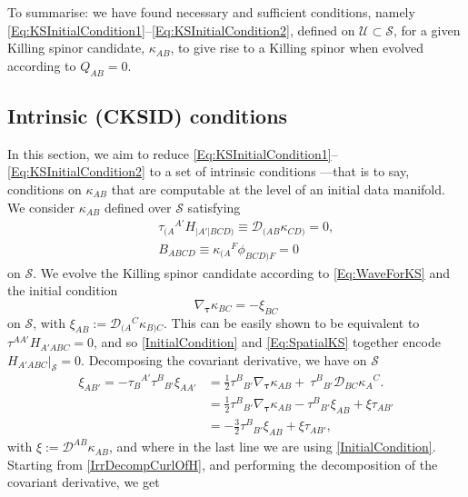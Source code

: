 \documentclass[10pt,a4paper]{article}
\theoremstyle{plain}
\begin{document}
To summarise: we have found necessary and sufficient conditions, namely \eqref{Eq:KSInitialCondition1}--\eqref{Eq:KSInitialCondition2}, defined on $\mathcal{U}\subset \mathcal{S}$, for a given Killing spinor candidate, $\kappa_{AB}$, to give rise to a Killing spinor when evolved according to $Q_{AB}=0$. 

\subsection{Intrinsic (CKSID) conditions}

In this section, we aim to reduce \eqref{Eq:KSInitialCondition1}--\eqref{Eq:KSInitialCondition2} to a set of intrinsic conditions ---that is to say, conditions on $\kappa_{AB}$ that are computable at the level of an initial data manifold. We consider $\kappa_{AB}$ defined over $\mathcal{S}$ satisfying
\begin{subequations}
\begin{eqnarray}
      && \tau_{(A}{}^{A'}H_{\vert A'\vert BCD)} \equiv  \mathcal{D}_{(AB}\kappa_{CD)}=0, \label{Eq:SpatialKS}\\
      && B_{ABCD}\equiv \kappa_{(A}{}^F\phi_{BCD)F} = 0 \label{Eq:VanishingBuchdahl}
\end{eqnarray}
\end{subequations}
on $\mathcal{S}$. We evolve the Killing spinor candidate according to \eqref{Eq:WaveForKS} and the initial condition
\begin{equation}
     \nabla_{\bm\tau} \kappa_{BC} = - \xi_{BC}\label{InitialCondition}
\end{equation}
on $\mathcal{S}$, with $\xi_{AB}:=\mathcal{D}_{(A}{}^C\kappa_{B)C}$. This can be easily shown to be equivalent to $\tau^{AA'}H_{A'ABC}=0$, and so \eqref{InitialCondition} and \eqref{Eq:SpatialKS} together encode $H_{A'ABC}\big\vert_{\mathcal{S}}=0$. Decomposing the covariant derivative, we have on $\mathcal{S}$
\begin{align}
\xi_{AB'} =  - \tau_{B}{}^{A'} \tau^{B}{}_{B'}\xi_{AA'} &=\tfrac{1}{2}\tau^{B}{}_{B'}\nabla_{\bm\tau}\kappa_{AB} + \
\tau^{B}{}_{B'} \mathcal{D}_{BC}\kappa_{A}{}^{C}. \nonumber\\
&=\tfrac{1}{2}\tau^{B}{}_{B'}\nabla_{\bm\tau}\kappa_{AB} - \tau^B{}_{B'}\xi_{AB} + \xi\tau_{AB'} \nonumber\\
&= -\tfrac{3}{2} \tau^B{}_{B'}\xi_{AB} + \xi\tau_{AB'} \label{DecompXiOnSUsingInitialCondition},
\end{align}
with $\xi:=\mathcal{D}^{AB}\kappa_{AB}$, and where in the last line we are using \eqref{InitialCondition}. Starting from \eqref{IrrDecompCurlOfH}, and performing the decomposition of the covariant derivative, we get
\end{document}
